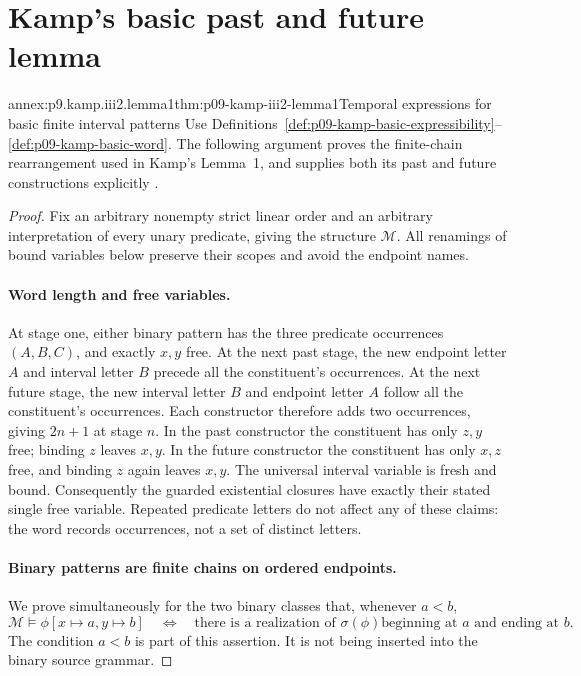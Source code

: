 
\section{Kamp's basic past and future lemma}
\label{sec:annex-p09-kamp-iii2-lemma1}

\begin{annexitem}{annex:p9.kamp.iii2.lemma1}{thm:p09-kamp-iii2-lemma1}{Temporal expressions for basic finite interval patterns}
Use Definitions~\ref{def:p09-kamp-basic-expressibility}--\ref{def:p09-kamp-basic-word}.
The following argument proves the finite-chain rearrangement used in Kamp's
Lemma~1, and supplies both its past and future constructions explicitly
\cite[ch.~III, pp.~63--66, 69--70]{Kamp1968}.

\begin{proof}
Fix an arbitrary nonempty strict linear order and an arbitrary interpretation
of every unary predicate, giving the structure \(\mathcal M\).  All
renamings of bound variables below preserve their scopes and avoid the
endpoint names.

\paragraph{Word length and free variables.}
At stage one, either binary pattern has the three predicate occurrences
\((A,B,C)\), and exactly \(x,y\) free.  At the next past stage,
the new endpoint letter \(A\) and interval letter \(B\) precede all
the constituent's occurrences.  At the next future stage, the new interval
letter \(B\) and endpoint letter \(A\) follow all the constituent's
occurrences.  Each constructor therefore adds two occurrences, giving
\(2n+1\) at stage \(n\).  In the past constructor the constituent has
only \(z,y\) free; binding \(z\) leaves \(x,y\).  In the future
constructor the constituent has only \(x,z\) free, and binding \(z\)
again leaves \(x,y\).  The universal interval variable is fresh and bound.
Consequently the guarded existential closures have exactly their stated
single free variable.  Repeated predicate letters do not affect any of
these claims: the word records occurrences, not a set of distinct letters.

\paragraph{Binary patterns are finite chains on ordered endpoints.}
We prove simultaneously for the two binary classes that, whenever \(a<b\),
\[
 \mathcal M\models\phi[x\mapsto a,y\mapsto b]
 \quad\Longleftrightarrow\quad
 \text{there is a realization of \(\sigma(\phi)\)
       beginning at \(a\) and ending at \(b\)}.
 \tag{1}
\]
The condition \(a<b\) is part of this assertion.  It is not being
inserted into the binary source grammar.


\end{proof}
\end{annexitem}
